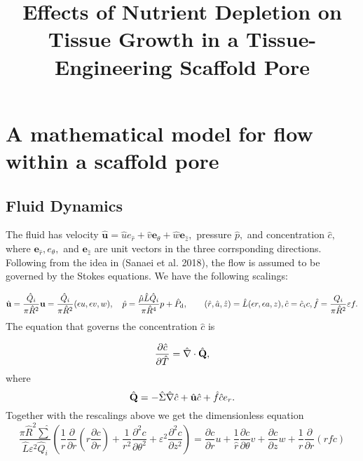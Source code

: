 \documentclass[12pt]{article}
\renewcommand{\(}{\left (}
\renewcommand{\)}{\right )}
\begin{document}
\title{Effects of Nutrient Depletion on Tissue Growth in a Tissue-Engineering Scaffold Pore}
\date{}


\section{A mathematical model for flow within a scaffold pore}
\subsection{Fluid Dynamics}

The fluid has velocity $\hat{\boldsymbol{u}}=\hat{u} e_{\hat{r}}+\hat{v} \boldsymbol{e}_{\theta}+\hat{w} \boldsymbol{e}_{\hat{z}},$ pressure $\hat{p},$ and concentration $\hat{c},$ where $\boldsymbol{e}_{\hat{r}}, {e}_{\theta},$ and $\boldsymbol{e}_{\hat{z}}$ are unit vectors in the three corrsponding directions. Following from the idea in (Sanaei et al. 2018), the flow is assumed to be governed by the Stokes equations. We have the following scalings:


\begin{eqnarray}
\label{eq:non-dimensionalization}
&\hat{ \bold{u}}=\displaystyle\frac{\hat{Q}_i}{\pi \hat R^2} \bold{u}=\displaystyle\frac{\hat{Q}_i}{\pi \hat R^2} (\epsilon u, \epsilon v, w), \quad \hat{p}=\displaystyle\frac{\hat \mu \hat L \hat{Q}_i}{\pi \hat R^4}p+\hat P_{\textrm{d}}, &\hspace{4mm}
(\hat{r},\hat{a},\hat{z})=\hat L(\epsilon r,\epsilon a, z), \hat{c}=\hat{c}_{i} c, \hat{f}=\frac{Q_i}{\pi \hat{R}^{2}} \varepsilon f.
\end{eqnarray}
The equation that governs the concentration $\hat{c}$ is

\begin{equation}
	\frac{\partial \hat{c}}{\partial \hat{T}}=\hat{\nabla} \cdot \hat{\bold{Q}},
\end{equation}
where
\begin{equation}
\hat{\bold{Q}}=-\hat{\Sigma} \hat{\nabla} \hat{c}+\hat{\bold{u}} \hat{c}+\hat{f} \hat{c} e_{r}.
\end{equation}
Together with the rescalings above we get the dimensionless equation
\begin{equation}
\frac{\pi \hat{R}^{2} \hat{\sum}}{\hat{L} \varepsilon^{2} \hat{Q}_{i}}\left(\frac{1}{r} \frac{\partial}{\partial r}\left(r \frac{\partial c}{\partial r}\right)+\frac{1}{r^{2}} \frac{\partial^{2} c}{\partial \theta^{2}}+\varepsilon^{2} \frac{\partial^{2} c}{\partial z^{2}}\right)= \frac{\partial c}{\partial r} u+\frac{1}{\hat{r}}\frac{\partial c}{\partial \theta} v+\frac{\partial c}{\partial z} w+\frac{1}{r} \frac{\partial}{\partial r}(r f c)
\end{equation}
\end{document}
